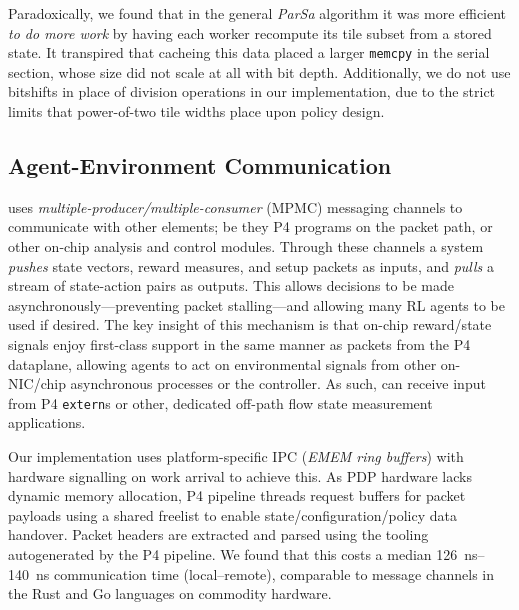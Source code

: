 Paradoxically, we found that in the general \emph{ParSa} algorithm it was more efficient \emph{to do more work} by having each worker recompute its tile subset from a stored state.
It transpired that cacheing this data placed a larger \texttt{memcpy} in the serial section, whose size did not scale at all with bit depth.
Additionally, we do not use bitshifts in place of division operations in our implementation, due to the strict limits that power-of-two tile widths place upon policy design.

\subsection{Agent-Environment Communication}\label{sec:agent-environment-communication}
\approachshort{} uses \emph{multiple-producer/multiple-consumer} (MPMC) messaging channels to communicate with other elements; be they P4 programs on the packet path, or other on-chip analysis and control modules.
Through these channels a system \emph{pushes} state vectors, reward measures, and setup packets as inputs, and \emph{pulls} a stream of state-action pairs as outputs.
This allows decisions to be made asynchronously---preventing packet stalling---and allowing many RL agents to be used if desired.
The key insight of this mechanism is that on-chip reward/state signals enjoy first-class support in the same manner as packets from the P4 dataplane, allowing agents to act on environmental signals from other on-NIC/chip asynchronous processes or the controller.
As such, \approachshort{} can receive input from P4 \texttt{extern}s or other, dedicated off-path flow state measurement applications.

Our implementation uses platform-specific IPC (\emph{EMEM ring buffers}) with hardware signalling on work arrival to achieve this.
As PDP hardware lacks dynamic memory allocation, P4 pipeline threads request buffers for packet payloads using a shared freelist to enable state/configuration/policy data handover.
Packet headers are extracted and parsed using the tooling autogenerated by the P4 pipeline.
We found that this costs a median \qtyrange{126}{140}{\nano\second} communication time (local--remote), comparable to message channels in the Rust and Go languages on commodity hardware.


